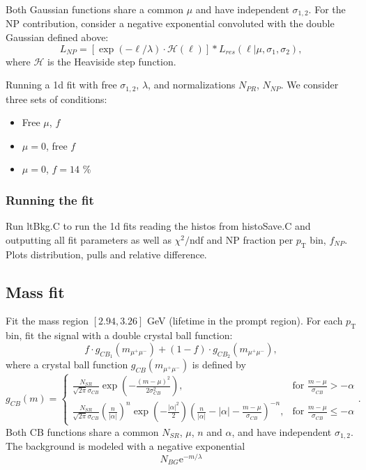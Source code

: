 \documentclass{article}
\newcommand{\pt}{p_\text{T}}
\begin{document}
Both Gaussian functions share a common $\mu$ and have independent $\sigma_{1,2}$. For the NP contribution, consider a negative exponential convoluted with the double Gaussian defined above:
\begin{equation}
L_{NP}=	\left[\exp(-\ell/\lambda)\cdot\mathcal{H}(\ell)\right]*L_{res}(\ell|\mu, \sigma_1,\sigma_2),
\end{equation}
where $\mathcal{H}$ is the Heaviside step function.

Running a 1d fit with free $\sigma_{1,2}$, $\lambda$, and normalizations $N_{PR}$, $N_{NP}$. We consider three sets of conditions:
\begin{itemize}
\item Free $\mu$, $f$
\item $\mu=0$, free $f$
\item $\mu=0$, $f=14$ \%
\end{itemize} 

\subsubsection{Running the fit}

Run ltBkg.C to run the 1d fits reading the histos from histoSave.C and outputting all fit parameters as well as $\chi^2/$ndf and NP fraction per $\pt$ bin, $f_{NP}$. Plots distribution, pulls and relative difference.

\pagebreak

\subsection{Mass fit}

Fit the mass region $[2.94, 3.26]$ GeV (lifetime in the prompt region). For each $\pt$ bin, fit the signal with a double crystal ball function:
\begin{equation}
f\cdot g_{CB_1}(m_{\mu^+\mu^-})+(1-f)\cdot g_{CB_2}(m_{\mu^+\mu^-}),
\end{equation}
where a crystal ball function $g_{CB}(m_{\mu^+\mu^-})$ is defined by
\begin{equation}
g_{CB}(m) = \begin{cases}
\frac{N_{SR}}{\sqrt{2\pi}\sigma_{CB}}\exp\left(-\frac{(m-\mu)^2}{2\sigma^2_{CB}}\right), & \text{for }\frac{m-\mu}{\sigma_{CB}} > -\alpha \\
\frac{N_{SR}}{\sqrt{2\pi}\sigma_{CB}}\left(\frac{n}{|\alpha|}\right)^n\exp\left(-\frac{|\alpha|^2}{2}\right)\left(\frac{n}{|\alpha|}-|\alpha|-\frac{m-\mu}{\sigma_{CB}}\right)^{-n}, & \text{for }\frac{m-\mu}{\sigma_{CB}}\leq-\alpha
\end{cases}.
\end{equation}
Both CB functions share a common $N_{SR}$, $\mu$, $n$ and $\alpha$, and have independent $\sigma_{1,2}$. The background is modeled with a negative exponential
\begin{equation}
N_{BG} \text{e}^{- m / \lambda}
\end{equation}
\end{document}
